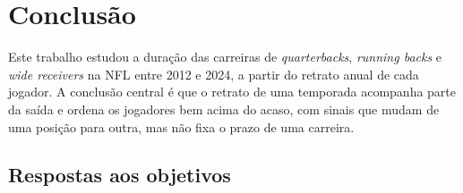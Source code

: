 
\chapter{Conclusão}
\label{cap:conclusao}

Este trabalho estudou a duração das carreiras de \textit{quarterbacks}, \textit{running backs} e \textit{wide receivers} na NFL entre 2012 e 2024, a partir do retrato anual de cada jogador. A conclusão central é que o retrato de uma temporada acompanha parte da saída e ordena os jogadores bem acima do acaso, com sinais que mudam de uma posição para outra, mas não fixa o prazo de uma carreira.

\section{Respostas aos objetivos}
\label{sec:respostas_objetivos}


